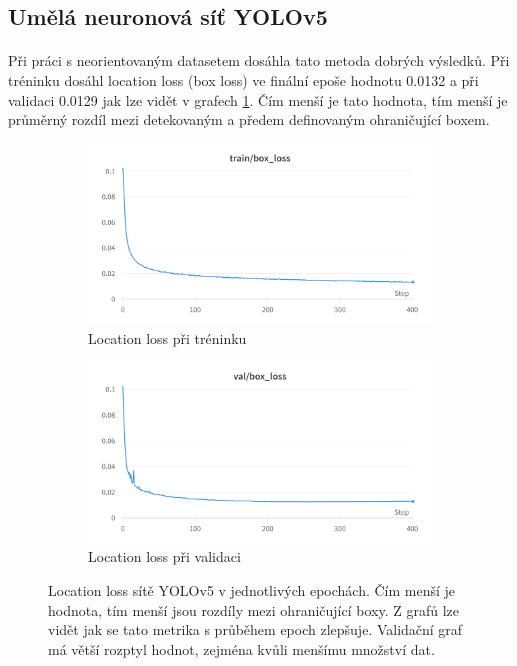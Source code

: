\subsection*{Umělá neuronová síť YOLOv5}
\label{yolov5_exp}
\paragraph{} Při práci s neorientovaným datasetem dosáhla tato metoda dobrých výsledků. Při tréninku dosáhl location loss (box loss) ve finální epoše hodnotu 0.0132 a při validaci 0.0129 jak lze vidět v grafech \ref{box1}. Čím menší je tato hodnota, tím menší je průměrný rozdíl mezi detekovaným a předem definovaným ohraničující boxem. 

\begin{figure}[h]\centering
    \centering
    \begin{subfigure}{0.7\textwidth}
    \includegraphics[width=0.95\linewidth]{obrazky-figures/train_box1.png}\hfill
    \caption{Location loss při tréninku}
    \end{subfigure}
    \begin{subfigure}{0.7\textwidth}
    \includegraphics[width=0.95\linewidth]{obrazky-figures/box_val1.png}\hfill
    \caption{Location loss při validaci}
    \end{subfigure}
    \caption{Location loss sítě YOLOv5 v jednotlivých epochách. Čím menší je hodnota, tím menší jsou rozdíly mezi ohraničující boxy. Z grafů lze vidět jak se tato metrika s průběhem epoch zlepšuje. Validační graf má větší rozptyl hodnot, zejména kvůli menšímu množství dat. }
    \label{box1}
\end{figure}


